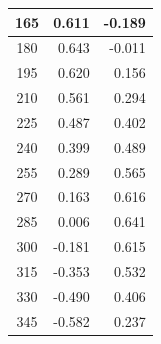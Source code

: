 \documentclass[twocolumn,a4j]{jsarticle}
\begin{document}
\begin{table}[htbp]
\begin{center}
\begin{tabular}{|p{20mm}|p{20mm}|p{20mm}|}
            \multicolumn{1}{|c|}{165}                  & \multicolumn{1}{|r|}{0.611}                & \multicolumn{1}{|r|}{-0.189}               \\ \hline
            \multicolumn{1}{|c|}{180}                  & \multicolumn{1}{|r|}{0.643}                & \multicolumn{1}{|r|}{-0.011}               \\ \hline
            \multicolumn{1}{|c|}{195}                  & \multicolumn{1}{|r|}{0.620}                & \multicolumn{1}{|r|}{0.156}                \\ \hline
            \multicolumn{1}{|c|}{210}                  & \multicolumn{1}{|r|}{0.561}                & \multicolumn{1}{|r|}{0.294}                \\ \hline
            \multicolumn{1}{|c|}{225}                  & \multicolumn{1}{|r|}{0.487}                & \multicolumn{1}{|r|}{0.402}                \\ \hline
            \multicolumn{1}{|c|}{240}                  & \multicolumn{1}{|r|}{0.399}                & \multicolumn{1}{|r|}{0.489}                \\ \hline
            \multicolumn{1}{|c|}{255}                  & \multicolumn{1}{|r|}{0.289}                & \multicolumn{1}{|r|}{0.565}                \\ \hline
            \multicolumn{1}{|c|}{270}                  & \multicolumn{1}{|r|}{0.163}                & \multicolumn{1}{|r|}{0.616}                \\ \hline
            \multicolumn{1}{|c|}{285}                  & \multicolumn{1}{|r|}{0.006}                & \multicolumn{1}{|r|}{0.641}                \\ \hline
            \multicolumn{1}{|c|}{300}                  & \multicolumn{1}{|r|}{-0.181}               & \multicolumn{1}{|r|}{0.615}                \\ \hline
            \multicolumn{1}{|c|}{315}                  & \multicolumn{1}{|r|}{-0.353}               & \multicolumn{1}{|r|}{0.532}                \\ \hline
            \multicolumn{1}{|c|}{330}                  & \multicolumn{1}{|r|}{-0.490}               & \multicolumn{1}{|r|}{0.406}                \\ \hline
            \multicolumn{1}{|c|}{345}                  & \multicolumn{1}{|r|}{-0.582}               & \multicolumn{1}{|r|}{0.237}                \\ \hline
        \end{tabular}
    \end{center}
\end{table}
\end{document}
